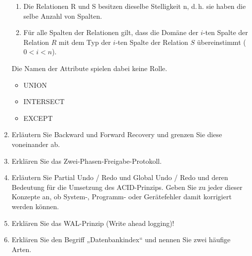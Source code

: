 \documentclass{lehramt-informatik-aufgabe}
\begin{document}
\begin{enumerate}
\begin{antwort}
\begin{enumerate}
\item Die Relationen R und S besitzen dieselbe Stelligkeit n, d.\,h. sie
haben die selbe Anzahl von Spalten.

\item Für alle Spalten der Relationen gilt, dass die Domäne der $i$-ten
Spalte der Relation $R$ mit dem Typ der $i$-ten Spalte der Relation $S$
übereinstimmt ($0 < i < n$).
\end{enumerate}

Die Namen der Attribute spielen dabei keine Rolle.


\begin{itemize}
\item UNION
\item INTERSECT
\item EXCEPT
\end{itemize}
\end{antwort}

\item Erläutern Sie Backward und Forward Recovery und grenzen Sie diese
voneinander ab.

\item Erklären Sie das Zwei-Phasen-Freigabe-Protokoll.

\item Erläutern Sie Partial Undo / Redo und Global Undo / Redo und deren
Bedeutung für die Umsetzung des ACID-Prinzips. Geben Sie zu jeder dieser
Konzepte an, ob System-, Programm- oder Gerätefehler damit korrigiert
werden können.

\item Erklären Sie das WAL-Prinzip (Write ahead logging)!

\item Erklären Sie den Begriff „Datenbankindex“ und nennen Sie zwei
häufige Arten.
\end{enumerate}
\end{document}
